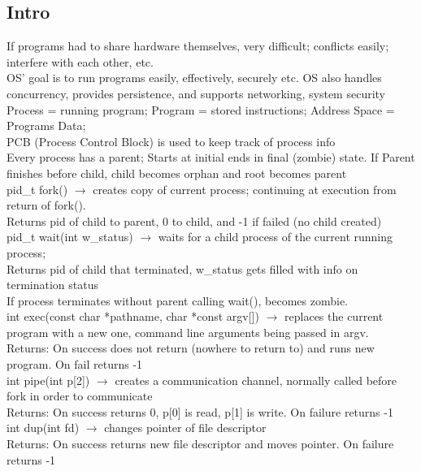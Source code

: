 \documentclass[8pt]{article}
\begin{document}
\subsection*{Intro}
If programs had to share hardware themselves, very difficult; conflicts easily; interfere with each other, etc.
\\
OS' goal is to run programs easily, effectively, securely etc.
OS also handles concurrency, provides persistence, and supports networking, system security
\\
Process = running program; Program = stored instructions; Address Space = Programs Data;
\\
PCB (Process Control Block) is used to keep track of process info
\\
Every process has a parent; Starts at initial ends in final (zombie) state.
If Parent finishes before child, child becomes orphan and root becomes parent
\\
pid\_t fork() $\rightarrow$ creates copy of current process; continuing at execution from return of fork().
\\
Returns pid of child to parent, 0 to child, and -1 if failed (no child created)
\\
pid\_t wait(int\* w\_status) $\rightarrow$ waits for a child process of the current running process;
\\
Returns pid of child that terminated, w\_status gets filled with info on termination status
\\
If process terminates without parent calling wait(), becomes zombie.
\\
int exec(const char *pathname, char *const argv[]) $\rightarrow$ replaces the current program with a new one, command line arguments being passed in argv.
\\
Returns: On success does not return (nowhere to return to) and runs new program. On fail returns -1
\\
int pipe(int p[2]) $\rightarrow$ creates a communication channel, normally called before fork in order to communicate
\\
Returns: On success returns 0, p[0] is read, p[1] is write. On failure returns -1
\\
int dup(int fd) $\rightarrow$ changes pointer of file descriptor
\\
Returns: On success returns new file descriptor and moves pointer. On failure returns -1
\end{document}
